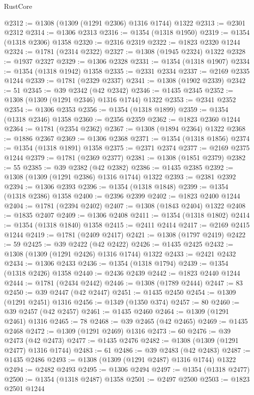 \begin{lexlean}{RustCore}
\begin{coremodule}
@2312 := @1308 (@1309 (@1291 @2306) @1316 @1744) @1322
@2313 := @2301 @2312
@2314 := @1306 @2313
@2316 := @1354 (@1318 @1950)
@2319 := @1354 (@1318 @2306) @1358
@2320 := @2316 @2319
@2322 := @1823 @2320 @1244
@2324 := @1781 (@2314 @2322)
@2327 := @1308 (@1945 @2324) @1322
@2328 := @1937 @2327
@2329 := @1306 @2328
@2331 := @1354 (@1318 @1907)
@2334 := @1354 (@1318 @1942) @1358
@2335 := @2331 @2334
@2337 := @2169 @2335 @1244
@2339 := @1781 (@2329 @2337)
@2341 := @1308 (@1902 @2339)
@2342 := 51
@2345 := @39 @2342 (@42 @2342)
@2346 := @1435 @2345
@2352 := @1308 (@1309 (@1291 @2346) @1316 @1744) @1322
@2353 := @2341 @2352
@2354 := @1306 @2353
@2356 := @1354 (@1318 @1899)
@2359 := @1354 (@1318 @2346) @1358
@2360 := @2356 @2359
@2362 := @1823 @2360 @1244
@2364 := @1781 (@2354 @2362)
@2367 := @1308 (@1894 @2364) @1322
@2368 := @1886 @2367
@2369 := @1306 @2368
@2371 := @1354 (@1318 @1856)
@2374 := @1354 (@1318 @1891) @1358
@2375 := @2371 @2374
@2377 := @2169 @2375 @1244
@2379 := @1781 (@2369 @2377)
@2381 := @1308 (@1851 @2379)
@2382 := 55
@2385 := @39 @2382 (@42 @2382)
@2386 := @1435 @2385
@2392 := @1308 (@1309 (@1291 @2386) @1316 @1744) @1322
@2393 := @2381 @2392
@2394 := @1306 @2393
@2396 := @1354 (@1318 @1848)
@2399 := @1354 (@1318 @2386) @1358
@2400 := @2396 @2399
@2402 := @1823 @2400 @1244
@2404 := @1781 (@2394 @2402)
@2407 := @1308 (@1843 @2404) @1322
@2408 := @1835 @2407
@2409 := @1306 @2408
@2411 := @1354 (@1318 @1802)
@2414 := @1354 (@1318 @1840) @1358
@2415 := @2411 @2414
@2417 := @2169 @2415 @1244
@2419 := @1781 (@2409 @2417)
@2421 := @1308 (@1797 @2419)
@2422 := 59
@2425 := @39 @2422 (@42 @2422)
@2426 := @1435 @2425
@2432 := @1308 (@1309 (@1291 @2426) @1316 @1744) @1322
@2433 := @2421 @2432
@2434 := @1306 @2433
@2436 := @1354 (@1318 @1794)
@2439 := @1354 (@1318 @2426) @1358
@2440 := @2436 @2439
@2442 := @1823 @2440 @1244
@2444 := @1781 (@2434 @2442)
@2446 := @1308 (@1789 @2444)
@2447 := 83
@2450 := @39 @2447 (@42 @2447)
@2451 := @1435 @2450
@2454 := @1309 (@1291 @2451) @1316
@2456 := @1349 (@1350 @374)
@2457 := 80
@2460 := @39 @2457 (@42 @2457)
@2461 := @1435 @2460
@2464 := @1309 (@1291 @2461) @1316
@2465 := 78
@2468 := @39 @2465 (@42 @2465)
@2469 := @1435 @2468
@2472 := @1309 (@1291 @2469) @1316
@2473 := 60
@2476 := @39 @2473 (@42 @2473)
@2477 := @1435 @2476
@2482 := @1308 (@1309 (@1291 @2477) @1316 @1744)
@2483 := 61
@2486 := @39 @2483 (@42 @2483)
@2487 := @1435 @2486
@2493 := @1308 (@1309 (@1291 @2487) @1316 @1744) @1322
@2494 := @2482 @2493
@2495 := @1306 @2494
@2497 := @1354 (@1318 @2477)
@2500 := @1354 (@1318 @2487) @1358
@2501 := @2497 @2500
@2503 := @1823 @2501 @1244

\end{coremodule}
\end{lexlean}
